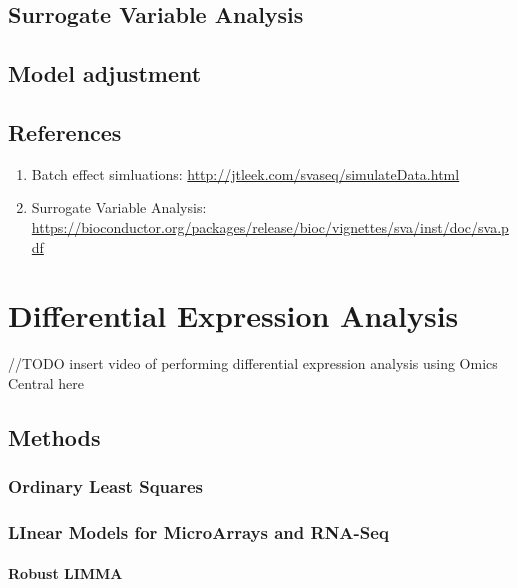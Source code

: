 \documentclass[]{book}
\providecommand{\tightlist}{%
  \setlength{\itemsep}{0pt}\setlength{\parskip}{0pt}}
\begin{document}
\section{Surrogate Variable Analysis}\label{surrogate-variable-analysis}

\section{Model adjustment}\label{model-adjustment}

\section{References}\label{references-1}

\begin{enumerate}
\def\labelenumi{\arabic{enumi}.}
\tightlist
\item
  Batch effect simluations:
  \url{http://jtleek.com/svaseq/simulateData.html}
\item
  Surrogate Variable Analysis:
  \url{https://bioconductor.org/packages/release/bioc/vignettes/sva/inst/doc/sva.pdf}
\end{enumerate}

\chapter{Differential Expression Analysis}\label{diff-exp}

//TODO insert video of performing differential expression analysis using
Omics Central here

\section{Methods}\label{methods}

\subsection{Ordinary Least Squares}\label{ordinary-least-squares}

\subsection{LInear Models for MicroArrays and
RNA-Seq}\label{linear-models-for-microarrays-and-rna-seq}

\subsubsection{Robust LIMMA}\label{robust-limma}
\end{document}
